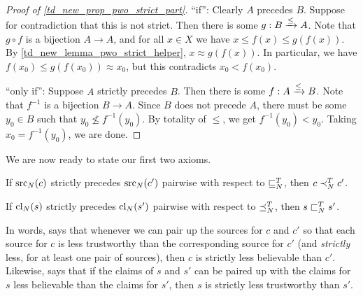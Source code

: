 \begin{proof}[Proof of \cref{td_new_prop_pwo_strict_part}]
    ``if'': Clearly $A$ precedes $B$. Suppose for contradiction that this is not
    strict. Then there is some ${g}:{B} \xrightarrow{\le} {A}$. Note that $g \circ f$
    is a bijection $A \to A$, and for all $x \in X$ we have $x \le f(x) \le
    g(f(x))$. By \cref{td_new_lemma_pwo_strict_helper}, $x \approx g(f(x))$. In
    particular, we have $f(x_0) \le g(f(x_0)) \approx x_0$, but this
    contradicts $x_0 < f(x_0)$.

    ``only if'': Suppose $A$ strictly precedes $B$. Then there is some
    ${f}:{A} \xrightarrow{\le} {B}$. Note that $f^{-1}$ is a bijection $B \to A$.
    Since $B$ does not precede $A$, there must be some $y_0 \in B$ such that
    $y_0 \not\le f^{-1}(y_0)$. By totality of $\le$, we get $f^{-1}(y_0) <
    y_0$. Taking $x_0 = f^{-1}(y_0)$, we are done.
\end{proof}

We are now ready to state our first two axioms.

\begin{axiomlist}
\begin{axiom}[\claimcoherence{}]
    If $\operatorname{src}_N(c)$ strictly precedes $\operatorname{src}_N(c')$ pairwise with respect to
    $\sqsubseteq_N^T$, then $c \prec_N^T c'$.
\end{axiom}
\begin{axiom}[\sourcecoherence{}]
    If $\operatorname{cl}_N(s)$ strictly precedes $\operatorname{cl}_N(s')$ pairwise with respect to
    $\preceq_N^T$, then $s \sqsubset_N^T s'$.
\end{axiom}
\end{axiomlist}

In words, \claimcoherence{} says that whenever we can pair up the sources for
$c$ and $c'$ so that each source for $c$ is less trustworthy
than the corresponding source for $c'$ (and \emph{strictly} less, for at least
one pair of sources), then $c$ is strictly less believable than $c'$. Likewise,
\sourcecoherence{} says that if the claims of $s$ and $s'$ can be paired up
with the claims for $s$ less believable than the claims for $s'$, then $s$ is
strictly less trustworthy than $s'$.

